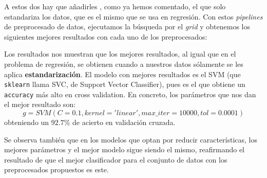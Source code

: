 \documentclass[a4paper, 20pt]{article}
\begin{document}
A estos dos hay que añadirles , como ya hemos comentado, el que solo estandariza los datos, que es el mismo que se usa en regresión. Con estos \emph{pipelines} de preprocesado de datos, ejecutamos la búsqueda por el \emph{grid} y obtenemos los siguientes mejores resultados con cada uno de los preprocesados:

\begin{minipage}{\textwidth}
  \begin{parcolumns}{3}



    \colplacechunks
  \end{parcolumns}
\end{minipage}

Los resultados nos muestran que los mejores resultados, al igual que en el problema de regresión, se obtienen cuando a nuestros datos sólamente se les aplica \textbf{estandarización}. El modelo con mejores resultados es el SVM (que \lstinline{sklearn} llama SVC, de Support Vector Classifier), pues es el que obtiene un \lstinline{accuracy} más alto en cross validation. En concreto, los parámetros que nos dan el mejor resultado son:
$$
g = SVM(C=0.1, kernel='linear', max\_iter=10000, tol=0.0001)
$$
obteniendo un $92.7\%$ de acierto en validación cruzada.

Se observa también que en los modelos que optan por reducir características, los mejores parámetros y el mejor modelo sigue siendo el mismo, reafirmando el resultado de que el mejor clasificador para el conjunto de datos con los preprocesados propuestos es este.
\end{document}
